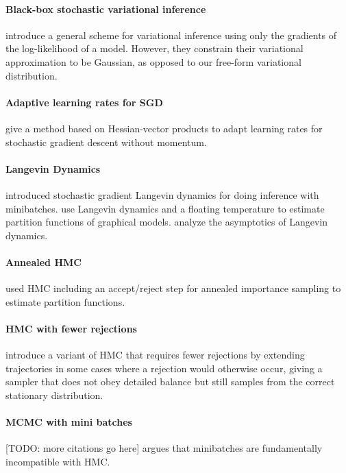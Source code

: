 \documentclass[]{article}
\begin{document}
\paragraph{Black-box stochastic variational inference}
\citet{alp2014blackbox} introduce a general scheme for variational inference using only the gradients of the log-likelihood of a model.
However, they constrain their variational approximation to be Gaussian, as opposed to our free-form variational distribution.

\paragraph{Adaptive learning rates for SGD}
\citet{courbariaux2014low} give a method based on Hessian-vector products to adapt learning rates for stochastic gradient descent without momentum.


\paragraph{Langevin Dynamics}
\citet{welling2011bayesian} introduced stochastic gradient Langevin dynamics for doing inference with minibatches.
\citet{ma2013estimating} use Langevin dynamics and a floating temperature to estimate partition functions of graphical models.
\citet{vollmer2015non} analyze the asymptotics of Langevin dynamics.

\paragraph{Annealed HMC}
\citet{sohl2012hamiltonian} used HMC including an accept/reject step for annealed importance sampling to estimate partition functions.

\paragraph{HMC with fewer rejections}
\citet{sohl2014hamiltonian} introduce a variant of HMC that requires fewer rejections by extending trajectories in some cases where a rejection would otherwise occur, giving a sampler that does not obey detailed balance but still samples from the correct stationary distribution.

\paragraph{MCMC with mini batches}
[TODO: more citations go here]
\citet{betancourt2015fundamental} argues that minibatches are fundamentally incompatible with HMC.
\end{document}
